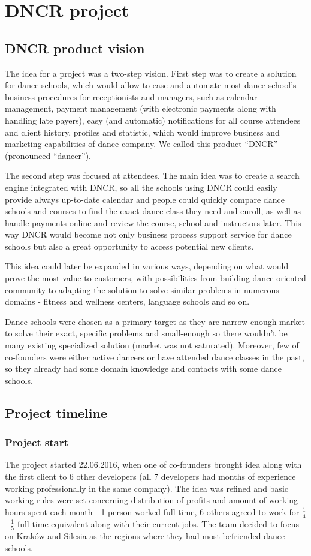 \documentclass{article}
\begin{document}
\section{DNCR project}

\subsection{DNCR product vision}
The idea for a project was a two-step vision. First step was to create a solution for dance schools, which would allow to ease and automate most dance school's business procedures for receptionists and managers, such as calendar management, payment management (with electronic payments along with handling late payers), easy (and automatic) notifications for all course attendees and client history, profiles and statistic, which would improve business and marketing capabilities of dance company. We called this product ``DNCR'' (pronounced ``dancer'').

The second step was focused at attendees. The main idea was to create a search engine integrated with DNCR, so all the schools using DNCR could easily provide always up-to-date calendar and people could quickly compare dance schools and courses to find the exact dance class they need and enroll, as well as handle payments online and review the course, school and instructors later. This way DNCR would become not only business process support service for dance schools but also a great opportunity to access potential new clients.

This idea could later be expanded in various ways, depending on what would prove the most value to customers, with possibilities from building dance-oriented community to adapting the solution to solve similar problems in numerous domains - fitness and wellness centers, language schools and so on.

Dance schools were chosen as a primary target as they are narrow-enough market to solve their exact, specific problems and small-enough so there wouldn't be many existing specialized solution (market was not saturated). Moreover, few of co-founders were either active dancers or have attended dance classes in the past, so they already had some domain knowledge and contacts with some dance schools.

\subsection{Project timeline}
\subsubsection{Project start}
The project started 22.06.2016, when one of co-founders brought idea along with the first client to 6 other developers (all 7 developers had months of experience working professionally in the same company). The idea was refined and basic working rules were set concerning distribution of profits and amount of working hours spent each month - 1 person worked full-time, 6 others agreed to work for \( \frac{1}{4} \) - \( \frac{1}{5} \) full-time equivalent along with their current jobs. The team decided to focus on Kraków and Silesia as the regions where they had most befriended dance schools.
\end{document}
